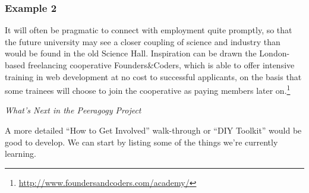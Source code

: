 \subsubsection*{Example 2} It will often be pragmatic to connect
 with employment quite promptly, so that
the future university may see a closer coupling of science and
industry than would be found in the old Science Hall.  Inspiration can
be drawn the London-based freelancing cooperative Founders\&Coders,
which is able to offer intensive training in web development at no
cost to successful applicants, on the basis that some trainees will
choose to join the cooperative as paying members later
on.\footnote{\url{http://www.foundersandcoders.com/academy/}}


\begin{framed}
\noindent 
\emph{What's Next in the Peeragogy Project}
\begin{collectinmacro}{\NewcomerWN}{}{}
A more detailed ``How to Get Involved'' walk-through or ``DIY Toolkit'' would be good to develop. We can start by listing some of the things we're currently learning.
\end{collectinmacro}
\NewcomerWN
\end{framed}

\newpage

